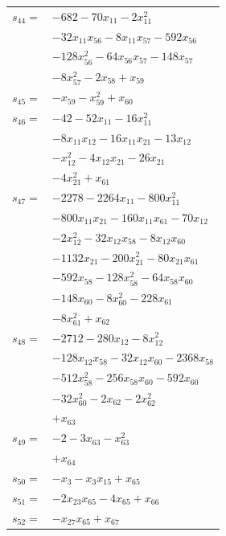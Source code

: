 \begin{longtable}{@{}r@{\;}l@{}}
\(s_{44}=\) & \(\displaystyle -682 -70x_{11} -2x_{11}^{2}\) \\
 & \(\displaystyle -32x_{11}x_{56} -8x_{11}x_{57} -592x_{56}\) \\
 & \(\displaystyle -128x_{56}^{2} -64x_{56}x_{57} -148x_{57}\) \\
 & \(\displaystyle -8x_{57}^{2} -2x_{58} +x_{59}\) \\[3pt]
\(s_{45}=\) & \(\displaystyle -x_{59} -x_{59}^{2} +x_{60}\) \\[3pt]
\(s_{46}=\) & \(\displaystyle -42 -52x_{11} -16x_{11}^{2}\) \\
 & \(\displaystyle -8x_{11}x_{12} -16x_{11}x_{21} -13x_{12}\) \\
 & \(\displaystyle -x_{12}^{2} -4x_{12}x_{21} -26x_{21}\) \\
 & \(\displaystyle -4x_{21}^{2} +x_{61}\) \\[3pt]
\(s_{47}=\) & \(\displaystyle -2278 -2264x_{11} -800x_{11}^{2}\) \\
 & \(\displaystyle -800x_{11}x_{21} -160x_{11}x_{61} -70x_{12}\) \\
 & \(\displaystyle -2x_{12}^{2} -32x_{12}x_{58} -8x_{12}x_{60}\) \\
 & \(\displaystyle -1132x_{21} -200x_{21}^{2} -80x_{21}x_{61}\) \\
 & \(\displaystyle -592x_{58} -128x_{58}^{2} -64x_{58}x_{60}\) \\
 & \(\displaystyle -148x_{60} -8x_{60}^{2} -228x_{61}\) \\
 & \(\displaystyle -8x_{61}^{2} +x_{62}\) \\[3pt]
\(s_{48}=\) & \(\displaystyle -2712 -280x_{12} -8x_{12}^{2}\) \\
 & \(\displaystyle -128x_{12}x_{58} -32x_{12}x_{60} -2368x_{58}\) \\
 & \(\displaystyle -512x_{58}^{2} -256x_{58}x_{60} -592x_{60}\) \\
 & \(\displaystyle -32x_{60}^{2} -2x_{62} -2x_{62}^{2}\) \\
 & \(\displaystyle +x_{63}\) \\[3pt]
\(s_{49}=\) & \(\displaystyle -2 -3x_{63} -x_{63}^{2}\) \\
 & \(\displaystyle +x_{64}\) \\[3pt]
\(s_{50}=\) & \(\displaystyle -x_{3} -x_{3}x_{15} +x_{65}\) \\[3pt]
\(s_{51}=\) & \(\displaystyle -2x_{23}x_{65} -4x_{65} +x_{66}\) \\[3pt]
\(s_{52}=\) & \(\displaystyle -x_{27}x_{65} +x_{67}\) \\[3pt]

\end{longtable}
